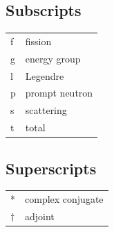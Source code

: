 \documentclass[10pt]{article}
\begin{document}
\begin{flushleft}
\begin{tabular}{l l l}
\end{tabular}


\subsection{Subscripts}

\begin{tabular}{l l}
f & fission\\
g & energy group\\
l & Legendre\\
p & prompt neutron\\
s & scattering\\
t & total\\
\end{tabular}

\subsection{Superscripts}
\begin{tabular}{l l}
* & complex conjugate\\
\(\dagger\) & adjoint\\
\end{tabular}

\end{flushleft}
\end{document}
